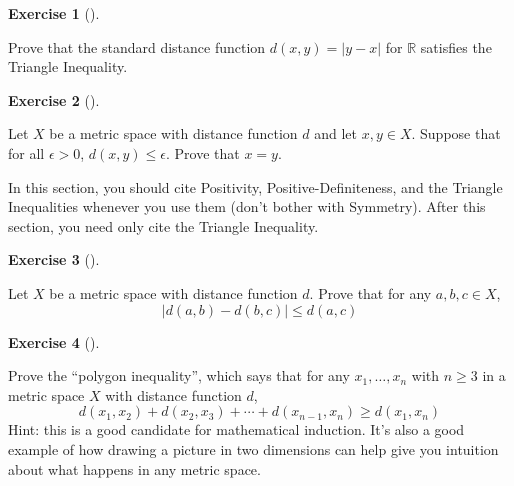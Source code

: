 \documentclass[
  letterpaper,
  DIV=11,
  numbers=noendperiod]{scrreprt}
\def\R{\mathbb R}
\theoremstyle{plain}
\theoremstyle{definition}
\newtheorem{exercise}{Exercise}[chapter]
\theoremstyle{plain}
\theoremstyle{plain}
\theoremstyle{definition}
\theoremstyle{definition}
\theoremstyle{remark}
\begin{document}
\begin{exercise}[]\protect\hypertarget{exr-triangle-inequality-in-r}{}\label{exr-triangle-inequality-in-r}

Prove that the standard distance function \(d(x,y)=|y-x|\) for \(\R\)
satisfies the Triangle Inequality.

\end{exercise}

\begin{exercise}[]\protect\hypertarget{exr-distance-less-than-all-epsilon}{}\label{exr-distance-less-than-all-epsilon}

Let \(X\) be a metric space with distance function \(d\) and let
\(x,y\in X\). Suppose that for all \(\epsilon>0\),
\(d(x,y)\leq \epsilon\). Prove that \(x=y\).

\end{exercise}

\begin{tcolorbox}[enhanced jigsaw, titlerule=0mm, opacitybacktitle=0.6, leftrule=.75mm, bottomrule=.15mm, left=2mm, arc=.35mm, colback=white, rightrule=.15mm, colframe=quarto-callout-tip-color-frame, toptitle=1mm, breakable, opacityback=0, colbacktitle=quarto-callout-tip-color!10!white, bottomtitle=1mm, title=\textcolor{quarto-callout-tip-color}{\faLightbulb}\hspace{0.5em}{Tip}, coltitle=black, toprule=.15mm]

In this section, you should cite Positivity, Positive-Definiteness, and
the Triangle Inequalities whenever you use them (don't bother with
Symmetry). After this section, you need only cite the Triangle
Inequality.

\end{tcolorbox}

\begin{exercise}[]\protect\hypertarget{exr-reverse-triangle-inequality}{}\label{exr-reverse-triangle-inequality}

Let \(X\) be a metric space with distance function \(d\). Prove that for
any \(a,b,c\in X\), \[|d(a,b)-d(b,c)|\leq d(a,c)\]

\end{exercise}

\begin{exercise}[]\protect\hypertarget{exr-ngon-inequality}{}\label{exr-ngon-inequality}

Prove the ``polygon inequality'', which says that for any
\(x_1,\ldots,x_n\) with \(n\geq 3\) in a metric space \(X\) with
distance function \(d\),
\[d(x_1,x_2)+d(x_2,x_3)+\cdots+d(x_{n-1},x_n)\geq d(x_1,x_n)\] Hint:
this is a good candidate for mathematical induction. It's also a good
example of how drawing a picture in two dimensions can help give you
intuition about what happens in any metric space.

\end{exercise}
\end{document}
